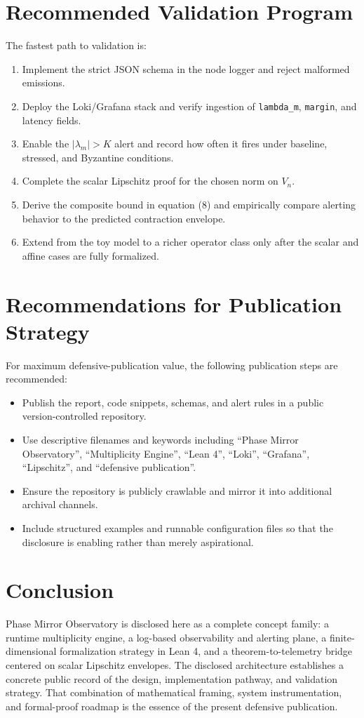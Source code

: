 \documentclass[11pt]{article}
\begin{document}
\section{Recommended Validation Program}
The fastest path to validation is:
\begin{enumerate}[label=\arabic*.]
    \item Implement the strict JSON schema in the node logger and reject malformed emissions.
    \item Deploy the Loki/Grafana stack and verify ingestion of \texttt{lambda\_m}, \texttt{margin}, and latency fields.
    \item Enable the $|\lambda_m| > K$ alert and record how often it fires under baseline, stressed, and Byzantine conditions.
    \item Complete the scalar Lipschitz proof for the chosen norm on $V_n$.
    \item Derive the composite bound in equation (8) and empirically compare alerting behavior to the predicted contraction envelope.
    \item Extend from the toy model to a richer operator class only after the scalar and affine cases are fully formalized.
\end{enumerate}

\section{Recommendations for Publication Strategy}
For maximum defensive-publication value, the following publication steps are recommended:
\begin{itemize}
    \item Publish the report, code snippets, schemas, and alert rules in a public version-controlled repository.
    \item Use descriptive filenames and keywords including ``Phase Mirror Observatory'', ``Multiplicity Engine'', ``Lean 4'', ``Loki'', ``Grafana'', ``Lipschitz'', and ``defensive publication''.
    \item Ensure the repository is publicly crawlable and mirror it into additional archival channels.
    \item Include structured examples and runnable configuration files so that the disclosure is enabling rather than merely aspirational.
\end{itemize}

\section{Conclusion}
Phase Mirror Observatory is disclosed here as a complete concept family: a runtime multiplicity engine, a log-based observability and alerting plane, a finite-dimensional formalization strategy in Lean 4, and a theorem-to-telemetry bridge centered on scalar Lipschitz envelopes. The disclosed architecture establishes a concrete public record of the design, implementation pathway, and validation strategy. That combination of mathematical framing, system instrumentation, and formal-proof roadmap is the essence of the present defensive publication.
\appendix
\end{document}
